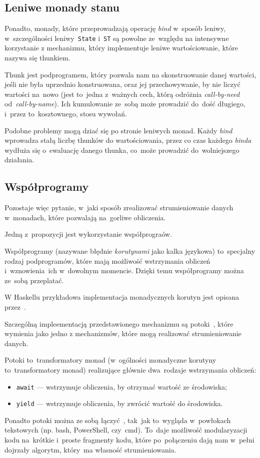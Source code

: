 \documentclass[../../thesis.tex]{subfiles}
\begin{document}
\subsection{Leniwe monady stanu}

Ponadto, monady, które przeprowadzają operację \emph{bind} w~sposób leniwy,
w~szczególności leniwy~\texttt{State} i~\texttt{ST} są powolne ze~względu
na intensywne korzystanie z mechanizmu, który implementuje leniwe wartościowanie,
które nazywa się thunkiem.

Thunk jest podprogramem, który pozwala nam na skonstruowanie danej wartości,
jeśli nie była uprzednio konstruowana, oraz jej przechowywanie, by nie
liczyć wartości na~nowo (jest to~jedna z~ważnych cech, którą odróżnia \emph{call-by-need}
od~\emph{call-by-name}). Ich kumulowanie ze~sobą może prowadzić do~dość długiego,
i~przez to~kosztownego, stosu wywołań. 

Podobne problemy mogą dziać się po stronie leniwych monad. Każdy \emph{bind}
wprowadza stałą liczbę thunków do wartościowania, przez co czas każdego \emph{binda}
wydłuża się o~ewaluację danego thunka, co~może prowadzić do~wolniejszego działania.

\subsection{Współprogramy}

Pozostaje więc pytanie, w~jaki sposób zrealizować strumieniowanie danych
w~monadach, które pozwalają na~gorliwe obliczenia.

Jedną z~propozycji jest wykorzystanie współprograów.

Współprogramy (nazywane błędnie \emph{korutynami} jako kalka językowa)
to~specjalny rodzaj podprogramów, które mają możliwość wstrzymania obliczeń
i~wznowienia~ich w~dowolnym momencie. Dzięki temu współprogramy można ze~sobą
przeplatać.

W Haskellu przykładowa implementacja monadycznych korutyn jest opisana 
przez~\cite{Blazevic:CP}.

Szczególną impleementacją przedstawionego mechanizmu są potoki~\cite{Blazevic:CP},
które~\cite{Thomasson:HHPP} wymienia jako jedno z mechanizmów, które mogą realizować
strumieniowanie danych.

Potoki to~transformatory monad (w~ogólności monadyczne korutyny to~transformatory monad)
realizujące głównie dwa~rodzaje wstrzymania obliczeń:
\begin{itemize}
  \item \texttt{await} --- wstrzymuje obliczenia, by otrzymać wartość ze środowiska;
  \item \texttt{yield} --- wstrzymuje obliczenia, by zwrócić wartość do środowiska.
\end{itemize}
Ponadto potoki można ze sobą łączyć~\cite{Blazevic:CP}, tak~jak to~wygląda 
w~powłokach tekstowych (np. bash, PowerShell, czy~cmd). To~daje możliwość
modularyzacji kodu na~krótkie i~proste fragmenty kodu, które po~połączeniu dają
nam w~pełni dojrzały algorytm, który~ma własność strumieniowania.
\end{document}
